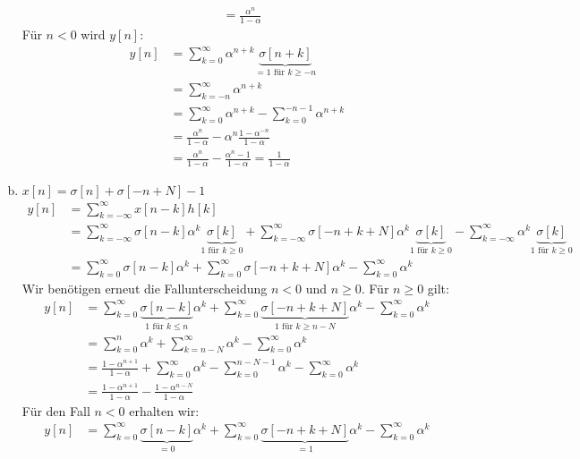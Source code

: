 \begin{enumerate}[a)]
\begin{align*}
						&= \frac{\alpha ^n}{1-\alpha}
			\end{align*}
			Für $n<0$ wird $y[n]$:
			\begin{align*}
				y[n]	&= \sum_{k=0}^{\infty}\alpha^{n+k} \underbrace{\sigma [n+k]}_{=1 \text{ für } k \ge -n} \\
						&= \sum_{k=-n}^{\infty}\alpha^{n+k} \\
						&= \sum_{k=0}^{\infty}\alpha^{n+k} - \sum_{k=0}^{-n-1}\alpha^{n+k} \\
						&= \frac{\alpha ^n}{1-\alpha} - \alpha ^n \frac{1-\alpha ^{-n}}{1-\alpha} \\
						&= \frac{\alpha ^n}{1-\alpha} - \frac{\alpha ^n -1}{1-\alpha} = \frac{1}{1-\alpha} 
			\end{align*}
		\item $x[n]=\sigma [n]+\sigma [-n+N]-1$
			\begin{align*}
				y[n]	&= \sum_{k=-\infty}^{\infty}x[n-k]h[k] \\
						&= \sum_{k=-\infty}^{\infty}\sigma[n-k]\alpha^k \underbrace{\sigma[k]}_{1 \text{ für } k\ge 0}+ \sum_{k=-\infty}^{\infty}\sigma[-n+k+N]\alpha^k \underbrace{\sigma[k]}_{1 \text{ für } k\ge 0} - \sum_{k=-\infty}^{\infty}\alpha^k \underbrace{\sigma[k]}_{1 \text{ für } k\ge 0} \\
						&= \sum_{k=0}^{\infty}\sigma[n-k]\alpha^k + \sum_{k=0}^{\infty}\sigma[-n+k+N]\alpha^k - \sum_{k=0}^{\infty}\alpha^k
			\end{align*}
			Wir benötigen erneut die Fallunterscheidung $n<0$ und $n\ge 0$. Für $n\ge 0$ gilt:
			\begin{align*}
				y[n]	&= \sum_{k=0}^{\infty}\underbrace{\sigma[n-k]}_{1 \text{ für } k\le n}\alpha^k + \sum_{k=0}^{\infty}\underbrace{\sigma[-n+k+N]}_{1 \text{ für } k\ge n-N}\alpha^k - \sum_{k=0}^{\infty}\alpha^k \\
						&= \sum_{k=0}^{n}\alpha^k + \sum_{k=n-N}^{\infty}\alpha^k - \sum_{k=0}^{\infty}\alpha^k \\
						&= \frac{1-\alpha ^{n+1}}{1-\alpha} + \sum_{k=0}^{\infty}\alpha^k -  \sum_{k=0}^{n-N-1}\alpha^k - \sum_{k=0}^{\infty}\alpha^k \\
						&= \frac{1-\alpha ^{n+1}}{1-\alpha} - \frac{1-\alpha^{n-N}}{1-\alpha}
			\end{align*}
			Für den Fall $n<0$ erhalten wir:
			\begin{align*}
				y[n]	&= \sum_{k=0}^{\infty}\underbrace{\sigma[n-k]}_{=0}\alpha^k + \sum_{k=0}^{\infty}\underbrace{\sigma[-n+k+N]}_{=1}\alpha^k - \sum_{k=0}^{\infty}\alpha^k \\

\end{align*}
\end{enumerate}
